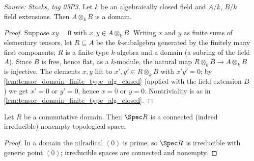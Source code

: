 \begin{lemma}\leanok
  \label{lem:tensor_domain_alg_closed}
  \textit{Source: Stacks, tag 05P3.}
  Let \(k\) be an algebraically closed field and \(A/k\), \(B/k\) field
  extensions. Then \(A \otimes_k B\) is a domain.
\end{lemma}
\begin{proof}
  \leanok
  Suppose \(x y = 0\) with \(x, y \in A \otimes_k B\). Writing \(x\) and
  \(y\) as finite sums of elementary tensors, let \(R \subseteq A\) be
  the \(k\)-subalgebra generated by the finitely many first components;
  \(R\) is a finite-type \(k\)-algebra and a domain (a subring of the
  field \(A\)). Since \(B\) is free, hence flat, as a \(k\)-module, the
  natural map \(R \otimes_k B \to A \otimes_k B\) is injective. The
  elements \(x, y\) lift to \(x', y' \in R \otimes_k B\) with
  \(x' y' = 0\); by \cref{lem:tensor_domain_finite_type_alg_closed}
  (applied with the field extension \(B\)) we get \(x' = 0\) or
  \(y' = 0\), hence \(x = 0\) or \(y = 0\). Nontriviality is as in
  \cref{lem:tensor_domain_finite_type_alg_closed}.
\end{proof}

\begin{lemma}\leanok
  \label{lem:spec_domain_connected}
  Let \(R\) be a commutative domain. Then \(\Spec R\) is a connected
  (indeed irreducible) nonempty topological space.
\end{lemma}
\begin{proof}
  \leanok
  In a domain the nilradical \((0)\) is prime, so \(\Spec R\) is
  irreducible with generic point \((0)\); irreducible spaces are
  connected and nonempty.
\end{proof}

